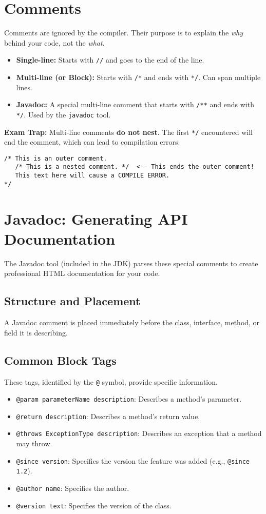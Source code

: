 \documentclass[12pt]{article}
\begin{document}
\begin{enumerate}[label=(\arabic*)]
\section{Comments}
Comments are ignored by the compiler. Their purpose is to explain the \textit{why} behind your code, not the \textit{what}.
\begin{itemize}
    \item \textbf{Single-line:} Starts with \texttt{//} and goes to the end of the line.
    \item \textbf{Multi-line (or Block):} Starts with \texttt{/*} and ends with \texttt{*/}. Can span multiple lines.
    \item \textbf{Javadoc:} A special multi-line comment that starts with \texttt{/**} and ends with \texttt{*/}. Used by the \texttt{javadoc} tool.
\end{itemize}

\textbf{Exam Trap:} Multi-line comments \textbf{do not nest}. The first \texttt{*/} encountered will end the comment, which can lead to compilation errors.
\begin{verbatim}
/* This is an outer comment.
   /* This is a nested comment. */  <-- This ends the outer comment!
   This text here will cause a COMPILE ERROR.
*/
\end{verbatim}

\section{Javadoc: Generating API Documentation}
The Javadoc tool (included in the JDK) parses these special comments to create professional HTML documentation for your code.

\subsection{Structure and Placement}
A Javadoc comment is placed immediately before the class, interface, method, or field it is describing.

\subsection{Common Block Tags}
These tags, identified by the \texttt{@} symbol, provide specific information.
\begin{itemize}
    \item \texttt{@param parameterName description}: Describes a method's parameter.
    \item \texttt{@return description}: Describes a method's return value.
    \item \texttt{@throws ExceptionType description}: Describes an exception that a method may throw.
    \item \texttt{@since version}: Specifies the version the feature was added (e.g., \texttt{@since 1.2}).
    \item \texttt{@author name}: Specifies the author.
    \item \texttt{@version text}: Specifies the version of the class.
\end{itemize}


\end{enumerate}
\end{document}
